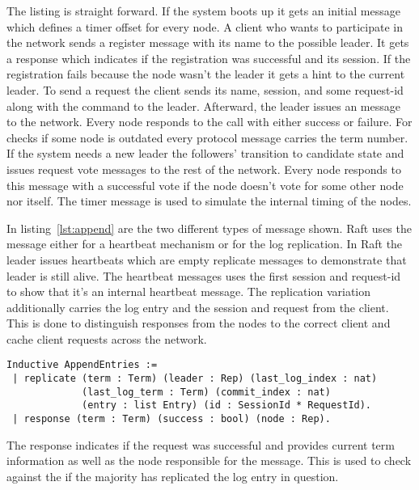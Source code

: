 The listing is straight forward. If the system boots up it gets
an initial message which defines a timer offset for every node. 
A client who wants to participate in the network sends a register
message with its name to the possible leader. It gets a response
which indicates if the registration was successful and its session.
If the registration fails because the node wasn't the leader it
gets a hint to the current leader. 
To send a request the client sends its name, session, and some request-id
along with the command to the leader. Afterward, the leader issues an 
 message to the network. Every node responds to
the call with either success or failure. For checks if some node
is outdated every protocol message carries the term number. 
If the system needs a new leader the followers' transition to
candidate state and issues request vote messages to the rest of the
network. Every node responds to this message with a successful vote
if the node doesn't vote for some other node nor itself.
The timer message is used to simulate the internal timing of the nodes.

In listing~\ref{lst:append} are the two different types of 
message shown. Raft uses the message either for a heartbeat mechanism or for
the log replication. In Raft the leader issues heartbeats which are
empty replicate messages to demonstrate that leader is still alive. 
The heartbeat messages uses the first session and request-id to show that
it's an internal heartbeat message. The replication variation additionally 
carries the log entry and the session and request from the client. 
This is done to distinguish responses from the nodes to the correct client
and cache client requests across the network.

\begin{lstlisting}[style=coq,label=lst:append,
caption=The two possible append entry calls in Raft.]
Inductive AppendEntries :=
 | replicate (term : Term) (leader : Rep) (last_log_index : nat)
             (last_log_term : Term) (commit_index : nat)
             (entry : list Entry) (id : SessionId * RequestId).
 | response (term : Term) (success : bool) (node : Rep).
\end{lstlisting}

The response indicates if the request was successful and provides current term
information as well as the node responsible for the message. This is used
to check against the  if the majority has replicated the log
entry in question.  

